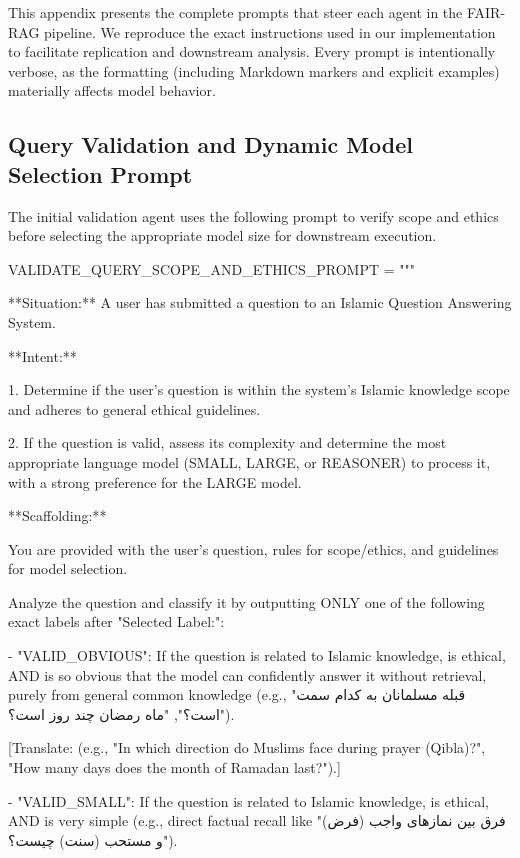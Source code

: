 \documentclass[11pt]{article}
\begin{document}
This appendix presents the complete prompts that steer each agent in the FAIR-RAG pipeline. We reproduce the exact instructions used in our implementation to facilitate replication and downstream analysis. Every prompt is intentionally verbose, as the formatting (including Markdown markers and explicit examples) materially affects model behavior.

\subsection{Query Validation and Dynamic Model Selection Prompt}

The initial validation agent uses the following prompt to verify scope and ethics before selecting the appropriate model size for downstream execution.

\begin{PromptBlock}
VALIDATE_QUERY_SCOPE_AND_ETHICS_PROMPT = """

**Situation:** A user has submitted a question to an Islamic Question Answering System.

**Intent:**

1. Determine if the user's question is within the system's Islamic knowledge scope and adheres to general ethical guidelines.

2. If the question is valid, assess its complexity and determine the most appropriate language model (SMALL, LARGE, or REASONER) to process it, with a strong preference for the LARGE model.

**Scaffolding:**

You are provided with the user's question, rules for scope/ethics, and guidelines for model selection.

Analyze the question and classify it by outputting ONLY one of the following exact labels after "Selected Label:":

- "VALID_OBVIOUS": If the question is related to Islamic knowledge, is ethical, AND is so obvious that the model can confidently answer it without retrieval, purely from general common knowledge (e.g., "قبله مسلمانان به کدام سمت است؟", "ماه رمضان چند روز است؟").

[Translate: (e.g., "In which direction do Muslims face during prayer (Qibla)?", "How many days does the month of Ramadan last?").]

- "VALID_SMALL": If the question is related to Islamic knowledge, is ethical, AND is very simple (e.g., direct factual recall like "فرق بین نمازهای واجب (فرض) و مستحب (سنت) چیست؟").


\end{PromptBlock}
\end{document}
